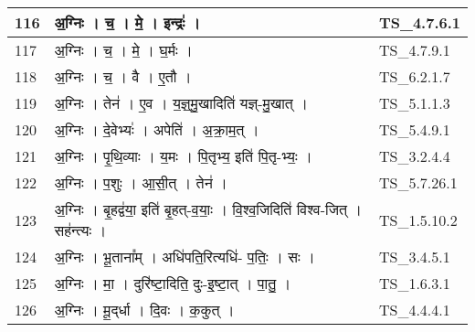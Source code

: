 \documentclass[17pt]{extarticle}
\begin{document}
\begin{longtable}{||p{0.4in}||p{4.9in}||p{0.9in}||}
    \hline
        
    116 & अ॒ग्निः   ।   च॒   ।   मे॒   ।   इन्द्रः॑   ।    & TS\_4.7.6.1       \\
    
    \hline
        
    117 & अ॒ग्निः   ।   च॒   ।   मे॒   ।   घ॒र्मः   ।    & TS\_4.7.9.1       \\
    
    \hline
        
    118 & अ॒ग्निः   ।   च॒   ।   वै   ।   ए॒तौ   ।    & TS\_6.2.1.7       \\
    
    \hline
        
    119 & अ॒ग्निः   ।   तेन॑   ।   ए॒व   ।   य॒ज्ञ्॒मु॒खादिति॑ यज्ञ्{-}मु॒खात्   ।    & TS\_5.1.1.3       \\
    
    \hline
        
    120 & अ॒ग्निः   ।   दे॒वेभ्यः॑   ।   अपेति॑   ।   अ॒क्रा॒म॒त्   ।    & TS\_5.4.9.1       \\
    
    \hline
        
    121 & अ॒ग्निः   ।   पृ॒थि॒व्याः   ।   य॒मः   ।   पि॒तृभ्य॒ इति॑ पि॒तृ{-}भ्यः॒   ।    & TS\_3.2.4.4       \\
    
    \hline
        
    122 & अ॒ग्निः   ।   प॒शुः   ।   आ॒सी॒त्   ।   तेन॑   ।    & TS\_5.7.26.1       \\
    
    \hline
        
    123 & अ॒ग्निः   ।   बृ॒हद्व॑या॒ इति॑ बृ॒हत्{-}व॒याः॒   ।   वि॒श्व॒जिदिति॑ विश्व{-}जित्   ।   सह॑न्त्यः   ।    & TS\_1.5.10.2       \\
    
    \hline
        
    124 & अ॒ग्निः   ।   भू॒ताना᳚म्   ।   अधि॑पति॒रित्यधि॑{-} प॒तिः॒   ।   सः   ।    & TS\_3.4.5.1       \\
    
    \hline
        
    125 & अ॒ग्निः   ।   मा॒   ।   दुरि॑ष्टा॒दिति॒ दुः{-}इ॒ष्टा॒त्   ।   पा॒तु॒   ।    & TS\_1.6.3.1       \\
    
    \hline
        
    126 & अ॒ग्निः   ।   मू॒द्‌र्धा   ।   दि॒वः   ।   क॒कुत्   ।    & TS\_4.4.4.1       \\
    

\end{longtable}
\end{document}
